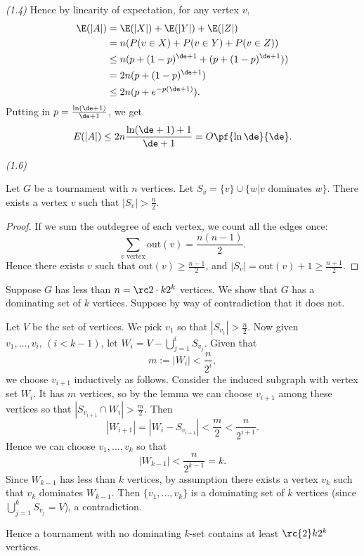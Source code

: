 \begin{problem} {\it (1.4)}
Hence by linearity of expectation, for any vertex $v$,
\begin{align*}
\E(|A|)&=\E(|X|)+\E(|Y|)+\E(|Z|)\\
&=n(P(v\in X)+P(v\in Y)+P(v\in Z))\\
&\leq n(p+(1-p)^{\de+1}+(p+(1-p)^{\de+1}))\\
&=2n(p+(1-p)^{\de+1})\\
&\leq 2n(p+e^{-p(\de+1)}).
\end{align*}
Putting in $p=\frac{\ln(\de+1)}{\de+1}$, we get
\[E(|A|)\leq 2n\frac{\ln(\de+1)+1}{\de+1}=O\pf{\ln \de}{\de}.\]
\end{problem}
\begin{problem} {\it (1.6)}
\begin{lem}
Let $G$ be a tournament with $n$ vertices. Let $S_v=\{v\}\cup \{w|v\text{ dominates }w\}$. 
There exists a vertex $v$ such that $|S_v|> \frac{n}{2}$.
\end{lem}
\begin{proof}
If we sum the outdegree of each vertex, we count all the edges once:
\[
\sum_{v\text{ vertex}}\text{out}(v)=\frac{n(n-1)}{2}.
\]
Hence there exists $v$ such that $\text{out}(v)\geq \frac{n-1}{2}$, and $|S_v|=\text{out}(v)+1\geq \frac{n+1}{2}$.
\end{proof}
Suppose $G$ has less than $n=\rc 2\cdot k2^k$ vertices. We show that $G$ has a dominating set of $k$ vertices. Suppose by way of contradiction that it does not.

Let $V$ be the set of vertices. We pick $v_1$ so that $|S_{v_1}|>\frac{n}{2}$. Now given $v_1,\ldots, v_i,\,(i<k-1)$, let $W_i=V-\bigcup_{j=1}^i S_{v_j}$. Given that
\[
m:=|W_i|< \frac{n}{2^i},
\]
we choose $v_{i+1}$ inductively as follows. Consider the induced subgraph with vertex set $W_i$. It has $m$ vertices, so by the lemma we can choose $v_{i+1}$ among these vertices so that $|S_{v_{i+1}}\cap W_i|>\frac{m}{2}$. Then
\[
|W_{i+1}|=|W_i-S_{v_{i+1}}|<\frac{m}{2}< \frac{n}{2^{i+1}}.
\]
Hence we can choose $v_1,\ldots, v_k$ so that
\[
|W_{k-1}|< \frac{n}{2^{k-1}}=k.
\]
Since $W_{k-1}$ has less than $k$ vertices, by assumption there exists a vertex $v_k$ such that $v_k$ dominates $W_{k-1}$. Then $\{v_1,\ldots, v_k\}$ is a dominating set of $k$ vertices (since $\bigcup_{j=1}^k S_{v_j}=V$), a contradiction.

Hence a tournament with no dominating $k$-set contains at least $\rc{2}k2^k$ vertices.
\end{problem}
